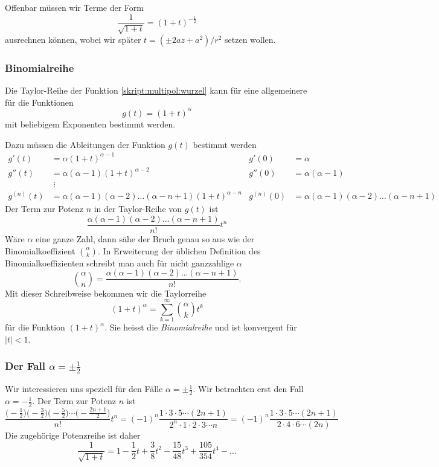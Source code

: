 Offenbar müssen wir Terme der Form
\begin{equation}
\frac{1}{\sqrt{1+t}}
=
(1+t)^{-\frac12}
\label{skript:multipol:wurzel}
\end{equation}
ausrechnen können, wobei wir später $t=(\pm2az+a^2)/r^2$ setzen wollen.

\subsubsection{Binomialreihe}
Die Taylor-Reihe der Funktion \eqref{skript:multipol:wurzel}
kann für eine allgemeinere für die Funktionen
\begin{equation}
g(t)=(1+t)^\alpha
\end{equation}
mit beliebigem Exponenten bestimmt werden.

Dazu müssen die Ableitungen der Funktion $g(t)$ bestimmt werden
\begin{align*}
g'(t)
&=
\alpha(1+t)^{\alpha-1}
&
g'(0)&=\alpha
\\
g''(t)
&=
\alpha(\alpha-1)(1+t)^{\alpha-2}
&
g''(0)&=\alpha(\alpha-1)
\\
&\;\vdots
\\
g^{(n)}(t)
&=
\alpha(\alpha-1)(\alpha-2)\dots(\alpha-n+1) (1+t)^{\alpha -n}
&
g^{(n)}(0)&=\alpha(\alpha-1)(\alpha-2)\dots(\alpha -n +1)
\end{align*}
Der Term zur Potenz $n$ in der Taylor-Reihe von $g(t)$ ist
\[
\frac{\alpha(\alpha-1)(\alpha-2)\dots(\alpha-n+1)}{n!} t^n
\]
Wäre $\alpha$ eine ganze Zahl, dann sähe der Bruch
genau so aus wie der Binomialkoeffizient $\binom{\alpha}{k}$.
In Erweiterung der üblichen Definition des Binomialkoeffizienten
schreibt man auch für nicht ganzzahlige $\alpha$
\[
\binom{\alpha}{n}
=
\frac{\alpha(\alpha-1)(\alpha-2)\dots(\alpha-n+1)}{n!}.
\]
Mit dieser Schreibweise bekommen wir die Taylorreihe
\[
(1+t)^\alpha=\sum_{k=1}^\infty \binom{\alpha}{k} t^k
\]
für die Funktion $(1+t)^\alpha$.
Sie heisst die {\em Binomialreihe} und ist konvergent für $|t|<1$.

\subsubsection{Der Fall $\alpha=\pm\frac12$}
Wir interessieren uns speziell für den Fälle $\alpha=\pm\frac12$.
Wir betrachten erst den Fall $\alpha=-\frac12$.
Der Term zur Potenz $n$ ist
\begin{equation}
\frac{
\bigl(-\frac12\bigr)
\bigl(-\frac32\bigr)
\bigl(-\frac52\bigr)
\cdots
\bigl(-\frac{2n+1}2\bigr)}{n!} t^n
=
(-1)^n \frac{1\cdot 3\cdot 5 \cdots (2n + 1)}{2^n\cdot 1\cdot 2\cdot 3\cdots n}
=
(-1)^n \frac{1\cdot 3\cdot 5 \cdots (2n+1)}{2\cdot 4\cdot 6\cdots (2n)}
\label{skript:multipol:koeffizienten}
\end{equation}
Die zugehörige Potenzreihe ist daher
\[
\frac1{\sqrt{1+t}}
=
1-\frac12t+\frac3{8}t^2-\frac{15}{48}t^3+\frac{105}{354}t^4-\dots
\]


